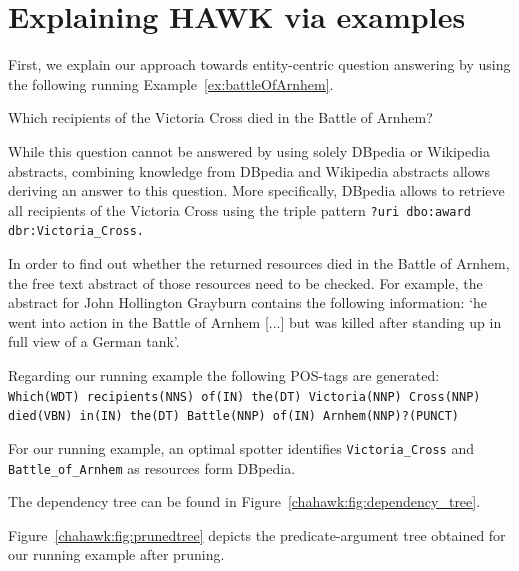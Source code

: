 \section{Explaining HAWK via examples}
\label{sec:hawkexample}
First, we explain our approach towards entity-centric question answering by using the following running Example~\ref{ex:battleOfArnhem}.
\begin{ex}
Which recipients of the Victoria Cross died in the Battle of Arnhem?
\label{ex:battleOfArnhem}
\end{ex}

While this question cannot be answered by using solely DBpedia or Wikipedia abstracts, combining knowledge from DBpedia and Wikipedia abstracts allows deriving an answer to this question. More specifically, DBpedia allows to retrieve all recipients of the Victoria Cross using the triple pattern \texttt{?uri dbo:award dbr:Victoria\_Cross.}

In order to find out whether the returned resources died in the Battle of Arnhem, the free text abstract of those resources need to be checked. For example, the abstract for John Hollington Grayburn contains the following information: 
`he went into action in the Battle of Arnhem [...] but was killed after standing up in full view of a German tank'.

Regarding our running example the following POS-tags are generated:
\texttt{Which(WDT) recipients(NNS) of(IN) the(DT) Victoria(NNP) Cross(NNP) died(VBN) in(IN) the(DT) Battle(NNP) of(IN) Arnhem(NNP)?(PUNCT)}


For our running example, an optimal spotter identifies \texttt{Victoria\_Cross} and \texttt{Battle\_of\_Arnhem} as resources form DBpedia.

The dependency tree can be found in Figure~\ref{chahawk:fig:dependency_tree}.

Figure~\ref{chahawk:fig:prunedtree} depicts the predicate-argument tree obtained for our running example after pruning.%

